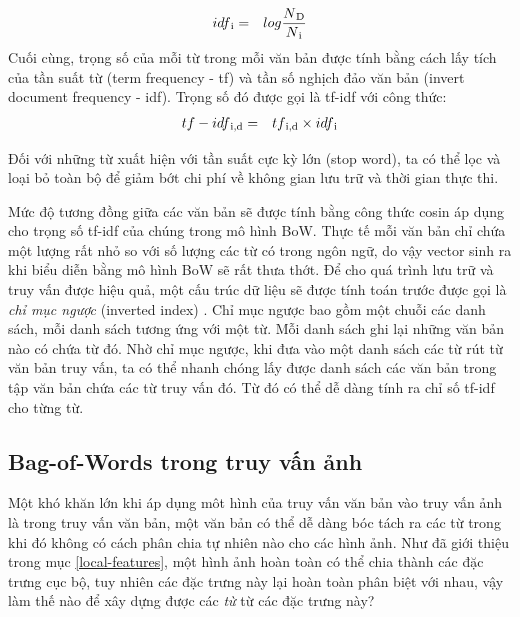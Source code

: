 \begin{eqnarray}
 idf\textsubscript{i} &=& log \frac{N\textsubscript{D}}{N\textsubscript{i}}
\end{eqnarray}
Cuối cùng, trọng số của mỗi từ trong mỗi văn bản được tính bằng cách lấy tích của tần suất từ (term frequency - tf) và tần số nghịch đảo văn bản (invert document frequency - idf). Trọng số đó được gọi là tf-idf \cite{manning2008introduction} với công thức:
\begin{eqnarray}
 tf-idf\textsubscript{i,d} &=& tf\textsubscript{i,d} \times idf\textsubscript{i}
\end{eqnarray}

Đối với những từ xuất hiện với tần suất cực kỳ lớn (stop word), ta có thể lọc và loại bỏ toàn bộ để giảm bớt chi phí về không gian lưu trữ và thời gian thực thi.

Mức độ tương đồng giữa các văn bản sẽ được tính bằng công thức cosin áp dụng cho trọng số tf-idf của chúng trong mô hình BoW. Thực tế mỗi văn bản chỉ chứa một lượng rất nhỏ so với số lượng các từ có trong ngôn ngữ, do vậy vector sinh ra khi biểu diễn bằng mô hình BoW sẽ rất thưa thớt. Để cho quá trình lưu trữ và truy vấn được hiệu quả, một cấu trúc dữ liệu sẽ được tính toán trước được gọi là \textit{chỉ mục ngược} (inverted index) \cite{manning2008introduction}. Chỉ mục ngược bao gồm một chuỗi các danh sách, mỗi danh sách tương ứng với một từ. Mỗi danh sách ghi lại những văn bản nào có chứa từ đó. Nhờ chỉ mục ngược, khi đưa vào một danh sách các từ rút từ văn bản truy vấn, ta có thể nhanh chóng lấy được danh sách các văn bản trong tập văn bản chứa các từ truy vấn đó. Từ đó có thể dễ dàng tính ra chỉ số tf-idf cho từng từ.

\subsection{Bag-of-Words trong truy vấn ảnh}
\label{bow-ir}
Một khó khăn lớn khi áp dụng môt hình của truy vấn văn bản vào truy vấn ảnh là trong truy vấn văn bản, một văn bản có thể dễ dàng bóc tách ra các từ trong khi đó không có cách phân chia tự nhiên nào cho các hình ảnh. Như đã giới thiệu trong mục \ref{local-features}, một hình ảnh hoàn toàn có thể chia thành các đặc trưng cục bộ, tuy nhiên các đặc trưng này lại hoàn toàn phân biệt với nhau, vậy làm thế nào để xây dựng được các \textit{từ} từ các đặc trưng này?


